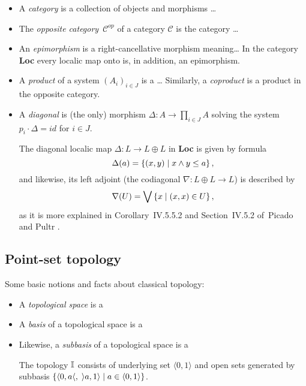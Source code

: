 \begin{itemize}
\item A \emph{category} is a collection of objects and morphisms \ldots
\item The \emph{opposite category}~$\mathcal{C}^{op}$ of a category
$\mathcal{C}$ is the category \ldots
\item An \emph{epimorphism} is a right-cancellative morphism meaning\ldots
In the category {\bf Loc} every localic map onto is, in addition, an
epimorphism.
\item A \emph{product} of a system $\left(A_i\right)_{i\in J}$ is a \ldots
Similarly, a \emph{coproduct} is a product in the opposite category.
\item A \emph{diagonal} is (the only) morphism $\Delta\colon A \to \prod_{i\in
J} A$ solving the system $p_i\cdot \Delta = id$ for $i \in J$.
  \begin{exmpl} \label{(co)diag-in-Loc}
    The diagonal localic map $\Delta\colon L \to L \oplus L$ in {\bf Loc} is
    given by formula
    \[
      \Delta(a) = \left\{ (x, y) \mid x \wedge y \leq a \right\},
    \]
    and likewise, its left adjoint (the codiagonal $\nabla\colon L \oplus L \to
    L$) is described by
    \[
      \nabla(U) = \bigvee \left\{ x \mid (x, x)\in U \right\},
    \]
    as it is more explained in Corollary~IV.5.5.2 and Section~IV.5.2 of~Picado
    and Pultr \cite{picado-pultr12}.
  \end{exmpl}
\end{itemize}


\subsection*{Point-set topology}

Some basic notions and facts about classical topology:

\begin{itemize}
\item A \emph{topological space} is a
\item A \emph{basis} of a topological space is a
\item Likewise, a \emph{subbasis} of a topological space is a
\begin{exmpl}
  The topology $\mathbb{I}$ consists of underlying set $\langle 0, 1 \rangle$ and open
  sets generated by subbasis $\{ \langle 0, a \langle, \; \rangle a, 1 \rangle
  \mid a\in \langle 0, 1 \rangle \}$.
\end{exmpl}
\end{itemize}

